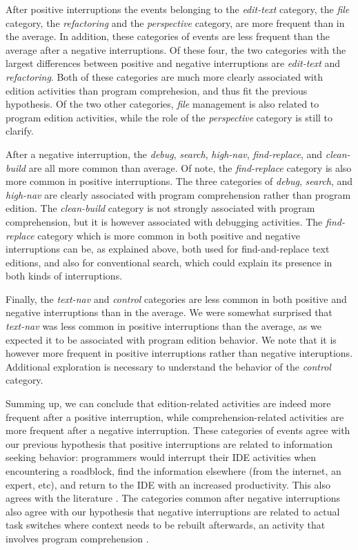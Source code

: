 \documentclass[times]{smrauth}
\newcommand\RR[1]{\textbf{Romain #1}}
\begin{document}
After positive interruptions the events belonging to the \emph{edit-text} category, the \emph{file} category, the \emph{refactoring} and the \emph{perspective} category, are more frequent than in the average. In addition, these categories of events are less frequent than the average after a negative interruptions. Of these four, the two categories with the largest differences between positive and negative interruptions are \emph{edit-text} and \emph{refactoring}. Both of these categories are much more clearly associated with edition activities than program comprehesion, and thus fit the previous hypothesis. Of the two other categories, \emph{file} management is also related to program edition activities, while the role of the \emph{perspective} category is still to clarify.

After a negative interruption, the \emph{debug}, \emph{search}, \emph{high-nav}, \emph{find-replace}, and \emph{clean-build} are all more common than average. Of note, the \emph{find-replace} category is also more common in positive interruptions. The three categories of \emph{debug}, \emph{search}, and \emph{high-nav} are clearly associated with program comprehension rather than program edition. The \emph{clean-build} category is not strongly associated with program comprehension, but it is however associated with debugging activities. The \emph{find-replace} category which is more common in both positive and negative interruptions can be, as explained above, both used for find-and-replace text editions, and also for conventional search, which could explain its presence in both kinds of interruptions.

Finally, the \emph{text-nav} and \emph{control} categories are less common in both positive and negative interruptions than in the average. We were somewhat surprised that \emph{text-nav} was less common in positive interruptions than the average, as we expected it to be associated with program edition behavior. We note that it is however more frequent in positive interruptions rather than negative interuptions. Additional exploration is necessary to understand the behavior of the \emph{control} category.

Summing up, we can conclude that edition-related activities are indeed more frequent after a positive interruption, while comprehension-related activities are more frequent after a negative interruption.  These categories of events agree with our previous hypothesis that positive interruptions are related to information seeking behavior: programmers would interrupt their IDE activities when encountering a roadblock, find the information elsewhere (from the internet, an expert, etc), and return to the IDE with an increased productivity. This also agrees with the literature \cite{PR11, LVD06}. The categories common after negative interruptions  also agree with our hypothesis that negative interruptions are related to actual task switches where context needs to be rebuilt afterwards, an activity that involves program comprehension \cite{MMLK14, PR12}. %
\end{document}
